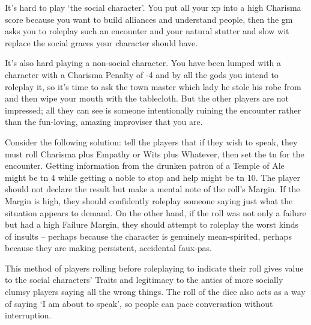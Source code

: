 \begin{multicols}{2}

It's hard to play `the social character'.
You put all your \gls{xp} into a high Charisma score because you want to build alliances and understand people, then the \gls{gm} asks you to roleplay such an encounter and your natural stutter and slow wit replace the social graces your character should have.

It's also hard playing a non-social character.
You have been lumped with a character with a Charisma Penalty of -4 and by all the gods you intend to roleplay it, so it's time to ask the town master which lady he stole his robe from and then wipe your mouth with the tablecloth.
But the other players are not impressed; all they can see is someone intentionally ruining the encounter rather than the fun-loving, amazing improviser that you are.

Consider the following solution: tell the players that if they wish to speak, they must roll Charisma plus Empathy or Wits plus Whatever, then set the \gls{tn} for the encounter.
Getting information from the drunken patron of a Temple of Ale might be \gls{tn} 4 while getting a noble to stop and help might be \gls{tn} 10.
The player should not declare the result but make a mental note of the roll's Margin.
If the Margin is high, they should confidently roleplay someone saying just what the situation appears to demand.
On the other hand, if the roll was not only a failure but had a high Failure Margin, they should attempt to roleplay the worst kinds of insults -- perhaps because the character is genuinely mean-spirited, perhaps because they are making persistent, accidental faux-pas.

This method of players rolling before roleplaying to indicate their roll gives value to the social characters' Traits and legitimacy to the antics of more socially clumsy players saying all the wrong things.
The roll of the dice also acts as a way of saying `I am about to speak', so people can pace conversation without interruption.

\end{multicols}
